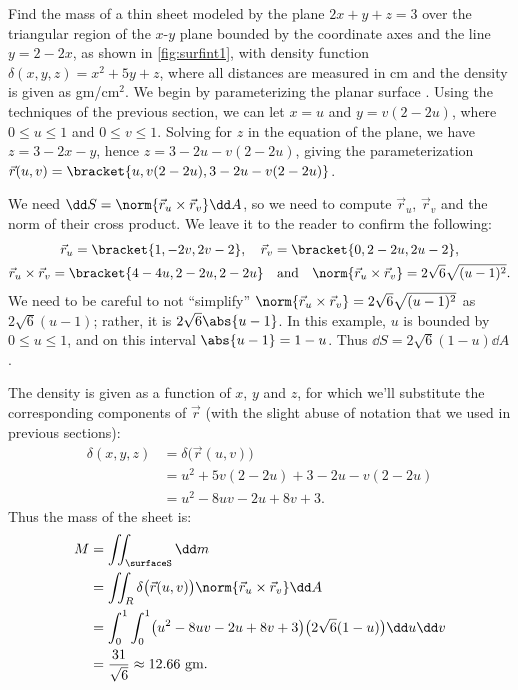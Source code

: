 \begin{example}\label{ex_surfint1}%
Find the mass of a thin sheet modeled by the plane $2x+y+z=3$ over the triangular region of the $x$-$y$ plane bounded by the coordinate axes and the line $y=2-2x$, as shown in \autoref{fig:surfint1}, with density function $\delta(x,y,z) = x^2+5y+z$, where all distances are measured in cm and the density is given as gm/cm$^2$.
\solution
We begin by parameterizing the planar surface \surfaceS. Using the techniques of the previous section, we can let $x=u$ and $y=v(2-2u)$, where $0\leq u\leq 1$ and $0\leq v\leq 1$. Solving for $z$ in the equation of the plane, we have $z=3-2x-y$, hence $z = 3-2u-v(2-2u)$, giving the parameterization
$\vec r(u,v) =\bracket{u, v(2-2u), 3-2u-v(2-2u)}$.

We need $\dd S=\norm{\vec r_u\times \vec r_v}\dd A$, so we need to compute $\vec r_u$, $\vec r_v$ and the norm of their cross product. We leave it to the reader to confirm the following:
\begin{gather*}
\vec r_u =\bracket{1,-2v,2v-2},\quad \vec r_v =\bracket{0,2-2u, 2u-2},\\
\vec r_u\times \vec r_v =\bracket{4-4u,2-2u,2-2u}
\quad \text{and}\quad
\norm{\vec r_u\times \vec r_v} = 2\sqrt{6}\sqrt{(u-1)^2}.
\end{gather*}
We need to be careful to not ``simplify'' $\norm{\vec r_u\times \vec r_v} = 2\sqrt{6}\sqrt{(u-1)^2}$ as $2\sqrt{6}(u-1)$; rather, it is $2\sqrt{6}\abs{u-1}$. In this example, $u$ is bounded by $0\leq u\leq 1$, and on this interval $\abs{u-1}= 1-u$. Thus $\dd S = 2\sqrt{6}(1-u)\dd A$. 

The density is given as a function of $x$, $y$ and $z$, for which we'll substitute the corresponding components of $\vec r$ (with the slight abuse of notation that we used in previous sections): 
\begin{align*}
	\delta(x,y,z)
	&= \delta\bigl(\vec r(u,v)\bigr) \\
	&= u^2 + 5v(2-2u)+3-2u-v(2-2u)\\
	&= u^2-8uv-2u+8v+3.
\end{align*}
Thus the mass of the sheet is:
\begin{align*}
	M &= \iint_{\surfaceS}\dd m\\
	&= \iint_R \delta\bigl(\vec r(u,v)\bigr)\norm{\vec r_u\times \vec r_v}\dd A\\
	&= \int_0^1\int_0^1 \bigl(u^2-8uv-2u+8v+3\bigr)\bigl(2\sqrt{6}(1-u)\bigr)\dd u\dd v\\
	&= \frac{31}{\sqrt{6}} \approx 12.66 \text{ gm.}
\end{align*}
\end{example}

